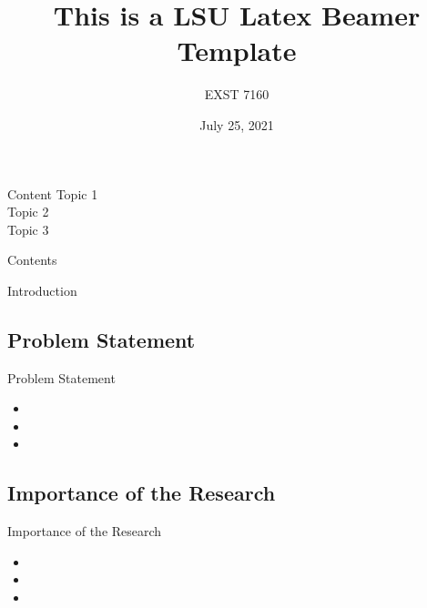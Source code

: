 \documentclass{beamer}
\title{This is a LSU Latex Beamer Template}
\subtitle{EXST 7160}
\author{}
\institute{Louisiana State University}
\date{July 25, 2021}
\begin{document}
\frame{\titlepage}

\begin{frame}{Content}
    \vspace{1ex}
   Topic 1\\
   Topic 2\\
   Topic 3\\
\end{frame}

\begin{frame}{Contents}
    \tableofcontents[hidesubsections]
\end{frame}

\begin{section}{Introduction}                   %
    \subsection{Problem Statement}              %
    \begin{frame}{Problem Statement}
        \begin{itemize}
            \item
            \item
            \item
        \end{itemize}
    \end{frame}

    \subsection{Importance of the Research}     %
    \begin{frame}{Importance of the Research}
        \begin{itemize}
            \item
            \item
            \item
        \end{itemize}
    \end{frame}
    \end{section}
\end{document}
